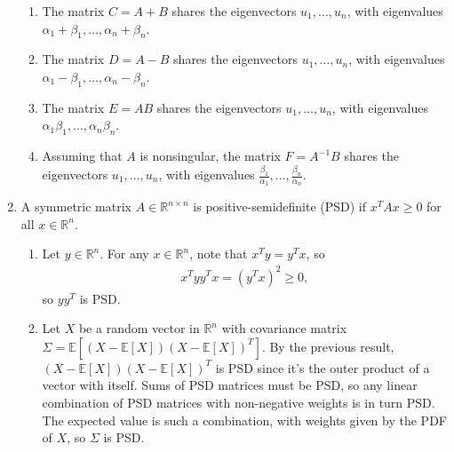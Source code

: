 \documentclass[11pt,letterpaper]{article}
\numberwithin{equation}{section}
\numberwithin{figure}{section}
\begin{document}
\begin{enumerate}
	\begin{enumerate}
		\item The matrix $C = A+B$ shares the eigenvectors $u_1,\ldots,u_n$, with eigenvalues \mbox{$\alpha_1+\beta_1,\ldots,\alpha_n+\beta_n$}.
		\item The matrix $D = A-B$ shares the eigenvectors $u_1,\ldots,u_n$, with eigenvalues \mbox{$\alpha_1-\beta_1,\ldots,\alpha_n-\beta_n$}.
		\item The matrix $E=AB$ shares the eigenvectors $u_1,\ldots,u_n$, with eigenvalues \mbox{$\alpha_1\beta_1,\ldots,\alpha_n\beta_n$}.
		\item Assuming that $A$ is nonsingular, the matrix $F = A^{-1}B$ shares the eigenvectors $u_1,\ldots,u_n$, with eigenvalues \mbox{$\frac{\beta_1}{\alpha_1},\ldots,\frac{\beta_n}{\alpha_n}$}.
	\end{enumerate}







	\item A symmetric matrix $A \in \mathbb{R}^{n\times n}$ is positive-semidefinite (PSD) if $x^T A x \geq 0$ for all $x \in \mathbb{R}^n$.
	\begin{enumerate}
		\item Let $y\in \mathbb{R}^n$. For any $x\in \mathbb{R}^n$, note that $x^T y = y^T x$, so
		\begin{align*}
			x^T y y^T x = (y^T x)^2 \geq 0,
		\end{align*}
		so $y y^T$ is PSD.

		\item Let $X$ be a random vector in $\mathbb{R}^n$ with covariance matrix $\Sigma = \mathbb{E}\left[(X-\mathbb{E}[X])(X-\mathbb{E}[X])^T\right]$. By the previous result, $(X-\mathbb{E}[X])(X-\mathbb{E}[X])^T$ is PSD since it's the outer product of a vector with itself. Sums of PSD matrices must be PSD, so any linear combination of PSD matrices with non-negative weights is in turn PSD. The expected value is such a combination, with weights given by the PDF of $X$, so $\Sigma$ is PSD.


\end{enumerate}
\end{enumerate}
\end{document}
